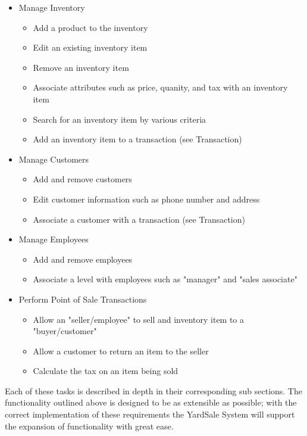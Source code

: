 \documentclass{report}
\begin{document}
\begin{itemize}
    \item {Manage Inventory}
    \begin{itemize}
    	\item {Add a product to the inventory}
	\item {Edit an existing inventory item}
	\item {Remove an inventory item}
	\item {Associate attributes such as price, quanity, and tax with an inventory item}
	\item {Search for an inventory item by various criteria}
	\item {Add an inventory item to a transaction (see Transaction)}
    \end{itemize}
    \item{Manage Customers}
    \begin{itemize}
    	\item{Add and remove customers}
	\item{Edit customer information such as phone number and address}
	\item{Associate a customer with a transaction (see Transaction)}
    \end{itemize}
    \item {Manage Employees}
    \begin{itemize}
    	\item{Add and remove employees}
	\item{Associate a level with employees such as "manager" and "sales associate"}
    \end{itemize}
    \item{Perform Point of Sale Transactions}
    \begin{itemize}
    	\item{ Allow an "seller/employee" to sell and inventory item to a "buyer/customer"  }
	\item{ Allow a customer to return an item to the seller }
	\item{ Calculate the tax on an item being sold }
    \end{itemize}
\end{itemize}

Each of these tasks is described in depth in their corresponding
sub sections. The functionality outlined above is designed to be as 
extensible as possible; with the correct implementation of these requirements
the YardSale System will support the expansion of functionality with great ease.
\end{document}
